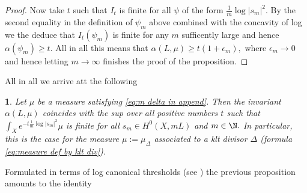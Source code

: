 \documentclass[11pt,oneside,english]{amsart}
\numberwithin{equation}{section}
\numberwithin{figure}{section}
\theoremstyle{plain}
\theoremstyle{plain}
\theoremstyle{plain}
\theoremstyle{plain}
\newtheorem{prop}[thm]{\protect\propositionname}
\theoremstyle{remark}
\theoremstyle{definition}
\providecommand{\propositionname}{Proposition}
\begin{document}
\begin{proof}
Now take $t$ such that $I_{t}$ is finite for all $\psi$ of the
form $\frac{1}{m}\log|s_{m}|^{2}.$ By the second equality in the
definition of $\psi_{m}$ above combined with the concavity of log
we the deduce that $I_{t}(\psi_{m})$ is finite for any $m$ sufficently
large and hence $\alpha(\psi_{m})\geq t.$ All in all this means that
$\alpha(L,\mu)\geq t(1+\epsilon_{m}),$ where $\epsilon_{m}\rightarrow0$
and hence letting $m\rightarrow\infty$ finishes the proof of the
proposition. 
\end{proof}
All in all we arrive att the following 
\begin{prop}
\label{pro:alpha inv as lct}\textup{Let $\mu$ be a measure satisfying
}\ref{eq:m delta in append}\textup{. Then the invariant $\alpha(L,\mu)$
coincides with the sup over all positive numbers $t$ such that $\int_{X}e^{-t\frac{1}{m}\log|s_{m}|^{2}}\mu$
is finite for all $s_{m}\in H^{0}(X,mL)$ and $m\in\N.$ In particular,
this is the case for the measure $\mu:=\mu_{\Delta}$ associated to
a klt divisor $\Delta$ (formula \ref{eq:measure def by klt div}). }
\end{prop}
Formulated in terms of log canonical thresholds (see \cite{dem2})
the previous proposition amounts to the identity 
\end{document}
